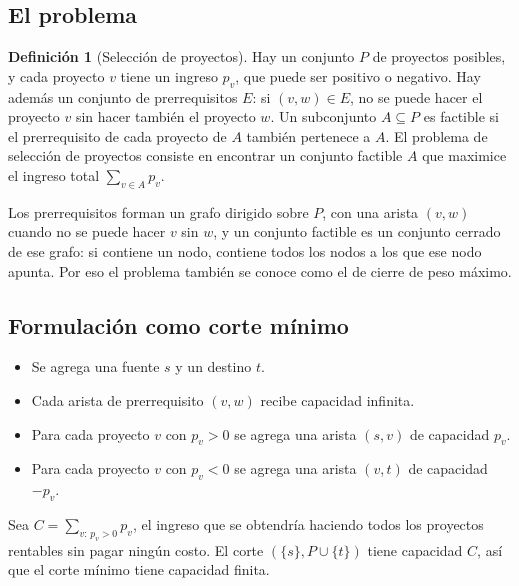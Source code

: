 \documentclass[12pt, spanish, oneside, openany]{book}
\theoremstyle{uprightplain}
\theoremstyle{definition}
\newtheorem{definicion}[teorema]{Definición}
\theoremstyle{remark}
\theoremstyle{definition}
\begin{document}
\subsection{El problema}

\begin{definicion}[Selección de proyectos]
\label{def:flujo-proyectos}
Hay un conjunto $P$ de proyectos posibles, y cada proyecto $v$ tiene un ingreso $p_v$, que puede ser positivo o negativo. Hay además un conjunto de prerrequisitos $E$: si $(v,w)\in E$, no se puede hacer el proyecto $v$ sin hacer también el proyecto $w$. Un subconjunto $A\subseteq P$ es factible si el prerrequisito de cada proyecto de $A$ también pertenece a $A$. El problema de selección de proyectos consiste en encontrar un conjunto factible $A$ que maximice el ingreso total $\sum_{v\in A}p_v$.
\end{definicion}

Los prerrequisitos forman un grafo dirigido sobre $P$, con una arista $(v,w)$ cuando no se puede hacer $v$ sin $w$, y un conjunto factible es un conjunto cerrado de ese grafo: si contiene un nodo, contiene todos los nodos a los que ese nodo apunta. Por eso el problema también se conoce como el de cierre de peso máximo.

\subsection{Formulación como corte mínimo}

\begin{itemize}
    \item Se agrega una fuente $s$ y un destino $t$.
    \item Cada arista de prerrequisito $(v,w)$ recibe capacidad infinita.
    \item Para cada proyecto $v$ con $p_v>0$ se agrega una arista $(s,v)$ de capacidad $p_v$.
    \item Para cada proyecto $v$ con $p_v<0$ se agrega una arista $(v,t)$ de capacidad $-p_v$.
\end{itemize}
Sea $C=\sum_{v:\,p_v>0}p_v$, el ingreso que se obtendría haciendo todos los proyectos rentables sin pagar ningún costo. El corte $(\{s\},P\cup\{t\})$ tiene capacidad $C$, así que el corte mínimo tiene capacidad finita.
\end{document}
